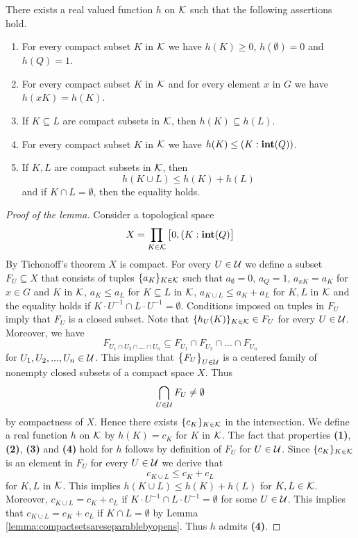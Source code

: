\begin{lemma}\label{lemma:definitiononcompactsets}
There exists a real valued function $h$ on ${\mathcal K}$ such that the following assertions hold.
\begin{enumerate}[label=\emph{\textbf{(\arabic*)}}, leftmargin=1.5em]
\item For every compact subset $K$ in ${\mathcal K}$ we have $h(K)\geq 0$, $h(\emptyset) = 0$ and $h(Q)=1$.
\item For every compact subset $K$ in ${\mathcal K}$ and for every element $x$ in $G$ we have $h(xK) = h(K)$.
\item If $K\subseteq L$ are compact subsets in ${\mathcal K}$, then $h(K)\subseteq h(L)$.
\item For every compact subset $K$ in ${\mathcal K}$ we have $h(K) \leq \left(K:\mathbf{int}(Q)\right)$.
\item If $K, L$ are compact subsets in ${\mathcal K}$, then
$$h(K\cup L) \leq h(K) + h(L)$$
and if $K \cap L = \emptyset$, then the equality holds.
\end{enumerate}
\end{lemma}
\begin{proof}[Proof of the lemma]
Consider a topological space
$$X = \prod_{K\in {\mathcal K}}\big[0,(K:\mathbf{int}(Q)\big]$$
By Tichonoff's theorem $X$ is compact. For every $U\in {\mathcal U}$ we define a subset $F_U\subseteq X$ that consists of tuples $\{a_K\}_{K\in {\mathcal K}}$ such that $a_{\emptyset} = 0$, $a_{Q}=1$, $a_{xK}= a_K$ for $x\in G$ and $K$ in ${\mathcal K}$, $a_K\leq a_L$ for $K\subseteq L$ in ${\mathcal K}$, $a_{K\cup L}\leq a_K + a_L$ for $K,L$ in ${\mathcal K}$ and the equality holds if $K\cdot U^{-1} \cap L\cdot U^{-1} = \emptyset$. Conditions imposed on tuples in $F_U$ imply that $F_U$ is a closed subset. Note that $\{h_U(K)\}_{K\in {\mathcal K}}\in F_U$ for every $U\in {\mathcal U}$. Moreover, we have
$$F_{U_1\cap U_2\cap ...\cap U_n} \subseteq F_{U_1}\cap F_{U_2}\cap ...\cap F_{U_n}$$
for $U_1, U_2,...,U_n\in {\mathcal U}$. This implies that $\big\{F_U\big\}_{U\in {\mathcal U}}$ is a centered family of nonempty closed subsets of a compact space $X$. Thus
$$\bigcap_{U\in {\mathcal U}}F_U \neq \emptyset$$
by compactness of $X$. Hence there exists $\{c_K\}_{K\in {\mathcal K}}$ in the intersection. We define a real function $h$ on ${\mathcal K}$ by $h(K) = c_K$ for $K$ in ${\mathcal K}$. The fact that properties \textbf{(1)}, \textbf{(2)}, \textbf{(3)} and \textbf{(4)} hold for $h$ follows by definition of $F_U$ for $U\in {\mathcal U}$. Since $\{c_K\}_{K\in {\mathcal K}}$ is an element in $F_U$ for every $U\in {\mathcal U}$ we derive that
$$c_{K\cup L} \leq c_K+c_L$$
for $K, L$ in ${\mathcal K}$. This implies $h(K\cup L) \leq h(K) + h(L)$ for $K, L\in {\mathcal K}$. Moreover, $c_{K\cup L} = c_K + c_L$ if $K\cdot U^{-1}\cap L\cdot U^{-1} = \emptyset$ for some $U\in {\mathcal U}$. This implies that $c_{K\cup L} = c_K + c_L$ if $K \cap L = \emptyset$ by Lemma \ref{lemma:compactsetsareseparablebyopens}. Thus $h$ admits \textbf{(4)}.
\end{proof}

